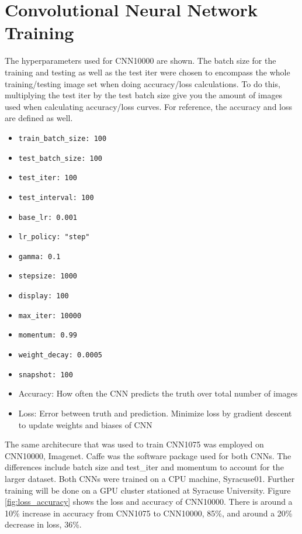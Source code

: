 \section{Convolutional Neural Network Training}\label{research approach}
The hyperparameters used for CNN10000 are shown. The batch size for the training and testing as well as the test iter were chosen to encompass the whole training/testing image set when doing accuracy/loss calculations. To do this, multiplying the test iter by the test batch size give you the amount of images used when calculating accuracy/loss curves. For reference, the accuracy and loss are defined as well. 


\begin{itemize}
 \item \verb|train_batch_size: 100|
 \item \verb|test_batch_size: 100|
 \item \verb|test_iter: 100|
 \item \verb|test_interval: 100|
 \item \verb|base_lr: 0.001|
 \item \verb|lr_policy: "step"|
 \item \verb|gamma: 0.1|
 \item \verb|stepsize: 1000|
 \item \verb|display: 100|
 \item \verb|max_iter: 10000|
 \item \verb|momentum: 0.99|
 \item \verb|weight_decay: 0.0005|
 \item \verb|snapshot: 100|
\item Accuracy: How often the CNN predicts the truth over total number of images
\item Loss: Error between truth and prediction. Minimize loss by gradient descent to update weights and biases of CNN
\end{itemize}

The same architecure that was used to train CNN1075 was employed on CNN10000, Imagenet. Caffe \cite{caffe} was the software package used for both CNNs. The differences include batch size and test{\_}iter and momentum to account for the larger dataset. Both CNNs were trained on a CPU machine, Syracuse01. Further training will be done on a GPU cluster stationed at Syracuse University. Figure \ref{fig:loss_accuracy} shows the loss and accuracy of CNN10000. There is around a 10\% increase in accuracy from CNN1075 to CNN10000, 85\%, and around a 20\% decrease in loss, 36\%.      

